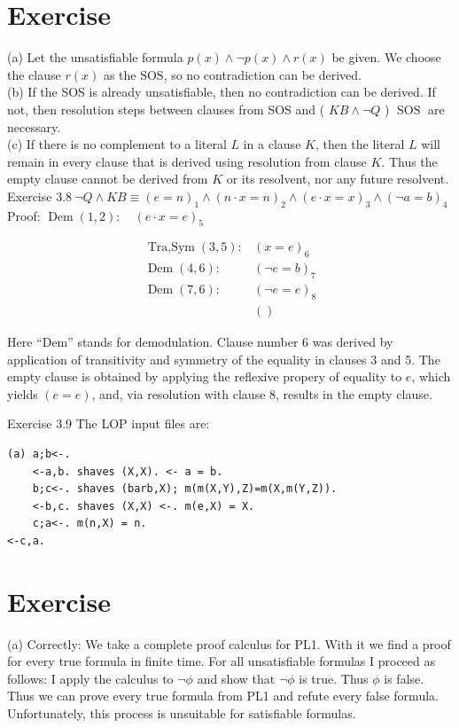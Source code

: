 \documentclass[10pt]{book}
\begin{document}
\section{Exercise}
(a) Let the unsatisfiable formula $p(x) \wedge \neg p(x) \wedge r(x)$ be given. We choose the clause $r(x)$ as the SOS, so no contradiction can be derived.\\
(b) If the SOS is already unsatisfiable, then no contradiction can be derived. If not, then resolution steps between clauses from SOS and ( $K B \wedge \neg Q$ ) $\operatorname{SOS}$ are necessary.\\
(c) If there is no complement to a literal $L$ in a clause $K$, then the literal $L$ will remain in every clause that is derived using resolution from clause $K$. Thus the empty clause cannot be derived from $K$ or its resolvent, nor any future resolvent.
Exercise $3.8\ \neg Q \wedge K B \equiv (e=n)_{1} \wedge (n \cdot x=n)_{2} \wedge (e \cdot x=x)_{3} \wedge (\neg a=b)_{4}$\\
Proof: $\operatorname{Dem}(1,2):\quad (e \cdot x=e)_{5}$

$$
\begin{array}{ll}
\operatorname{Tra,Sym}(3,5): & (x=e)_{6} \\
\operatorname{Dem}(4,6): & (\neg e=b)_{7} \\
\operatorname{Dem}(7,6): & (\neg e=e)_{8} \\
& ()
\end{array}
$$

Here ``Dem'' stands for demodulation. Clause number 6 was derived by application of transitivity and symmetry of the equality in clauses 3 and 5. The empty clause is obtained by applying the reflexive propery of equality to $e$, which yields $(e=e)$, and, via resolution with clause 8, results in the empty clause.

Exercise 3.9 The LOP input files are:

\begin{verbatim}
(a) a;b<-.
    <-a,b. shaves (X,X). <- a = b.
    b;c<-. shaves (barb,X); m(m(X,Y),Z)=m(X,m(Y,Z)).
    <-b,c. shaves (X,X) <-. m(e,X) = X.
    c;a<-. m(n,X) = n.
<-c,a.
\end{verbatim}

\section{Exercise}
(a) Correctly: We take a complete proof calculus for PL1. With it we find a proof for every true formula in finite time. For all unsatisfiable formulas I proceed as follows: I apply the calculus to $\neg \phi$ and show that $\neg \phi$ is true. Thus $\phi$ is false. Thus we can prove every true formula from PL1 and refute every false formula. Unfortunately, this process is unsuitable for satisfiable formulas.
\end{document}
